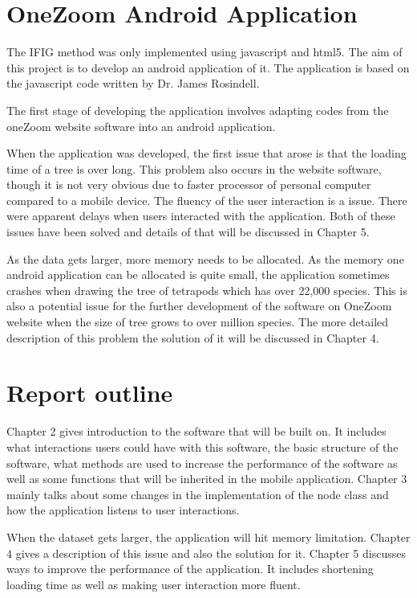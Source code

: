 \documentclass[MSc]{icldt}
\begin{document}
\section{OneZoom Android Application}

The IFIG method was only implemented using javascript and html5. The aim of this project is to develop an android application of it. The application is based on the javascript code written by Dr. James Rosindell. 

The first stage of developing the application involves adapting codes from the oneZoom website software into an android application.

When the application was developed, the first issue that arose is that the loading time of a tree is over long. This problem also occurs in the website software, though it is not very obvious due to faster processor of personal computer compared to a mobile device. The fluency of the user interaction is a issue. There were apparent delays when users interacted with the application. Both of these issues have been solved and details of that will be discussed in Chapter 5.

As the data gets larger, more memory needs to be allocated. As the memory one android application can be allocated is quite small, the application sometimes crashes when drawing the tree of tetrapods which has over 22,000 species. This is also a potential issue for the further development of the software on OneZoom website when the size of tree grows to over million species. The more detailed description of this problem the solution of it will be discussed in Chapter 4.



\section{Report outline}

Chapter 2 gives introduction to the software that will be built on. It includes what interactions users could have with this software, the basic structure of the software, what methods are used to increase the performance of the software as well as some functions that will be inherited in the mobile application. Chapter 3 mainly talks about some changes in the implementation of the node class and how the application listens to user interactions. 

 When the dataset gets larger, the application will hit memory limitation. Chapter 4 gives a description of this issue and also the solution for it. Chapter 5 discusses ways to improve the performance of the application. It includes shortening loading time as well as making user interaction more fluent.
 
\end{document}
